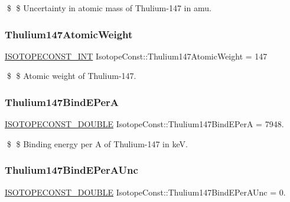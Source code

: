 \$ \$ Uncertainty in atomic mass of Thulium-\/147 in amu. \mbox{\label{group___isotope_const-_thulium-_tm147_ga0e75675329a7d2304995da9375376764}} 
\subsubsection{\texorpdfstring{Thulium147\+Atomic\+Weight}{Thulium147AtomicWeight}}
{\footnotesize\ttfamily \mbox{\hyperlink{group___isotope_const-_macros_ga5f18360b3e99483a35c32d789e62621c}{I\+S\+O\+T\+O\+P\+E\+C\+O\+N\+S\+T\+\_\+\+I\+NT}} Isotope\+Const\+::\+Thulium147\+Atomic\+Weight = 147}

\$ \$ Atomic weight of Thulium-\/147. \mbox{\label{group___isotope_const-_thulium-_tm147_ga8b6ec3c58d22320c60a7efa1deaac068}} 
\subsubsection{\texorpdfstring{Thulium147\+Bind\+E\+PerA}{Thulium147BindEPerA}}
{\footnotesize\ttfamily \mbox{\hyperlink{group___isotope_const-_macros_ga8f45a7272ce02c0b4c65c44636ed719a}{I\+S\+O\+T\+O\+P\+E\+C\+O\+N\+S\+T\+\_\+\+D\+O\+U\+B\+LE}} Isotope\+Const\+::\+Thulium147\+Bind\+E\+PerA = 7948.}

\$ \$ Binding energy per A of Thulium-\/147 in keV. \mbox{\label{group___isotope_const-_thulium-_tm147_gafc1151aef176ac87cda04e63e80aaa14}} 
\subsubsection{\texorpdfstring{Thulium147\+Bind\+E\+Per\+A\+Unc}{Thulium147BindEPerAUnc}}
{\footnotesize\ttfamily \mbox{\hyperlink{group___isotope_const-_macros_ga8f45a7272ce02c0b4c65c44636ed719a}{I\+S\+O\+T\+O\+P\+E\+C\+O\+N\+S\+T\+\_\+\+D\+O\+U\+B\+LE}} Isotope\+Const\+::\+Thulium147\+Bind\+E\+Per\+A\+Unc = 0.}

